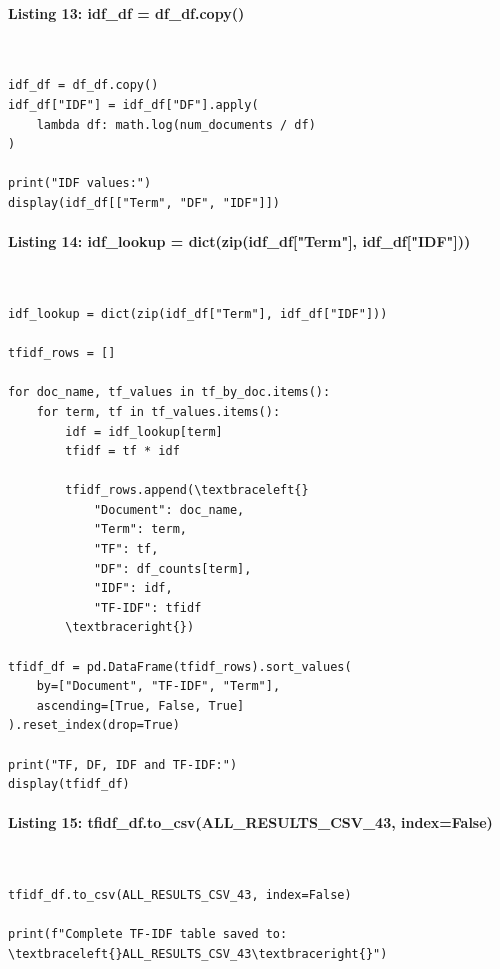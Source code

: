 \documentclass[12pt,a4paper,oneside]{report}
\begin{document}
\paragraph{Listing 13: idf\_df = df\_df.copy()}\mbox{}\\[-1ex]
\begin{Verbatim}[commandchars=\\\{\},breaklines=true,breakanywhere=true,fontsize=\scriptsize,frame=leftline,framesep=2mm,rulecolor=\color{gray}]
idf_df = df_df.copy()
idf_df["IDF"] = idf_df["DF"].apply(
    lambda df: math.log(num_documents / df)
)

print("IDF values:")
display(idf_df[["Term", "DF", "IDF"]])
\end{Verbatim}
\paragraph{Listing 14: idf\_lookup = dict(zip(idf\_df["Term"], idf\_df["IDF"]))}\mbox{}\\[-1ex]
\begin{Verbatim}[commandchars=\\\{\},breaklines=true,breakanywhere=true,fontsize=\scriptsize,frame=leftline,framesep=2mm,rulecolor=\color{gray}]
idf_lookup = dict(zip(idf_df["Term"], idf_df["IDF"]))

tfidf_rows = []

for doc_name, tf_values in tf_by_doc.items():
    for term, tf in tf_values.items():
        idf = idf_lookup[term]
        tfidf = tf * idf

        tfidf_rows.append(\textbraceleft{}
            "Document": doc_name,
            "Term": term,
            "TF": tf,
            "DF": df_counts[term],
            "IDF": idf,
            "TF-IDF": tfidf
        \textbraceright{})

tfidf_df = pd.DataFrame(tfidf_rows).sort_values(
    by=["Document", "TF-IDF", "Term"],
    ascending=[True, False, True]
).reset_index(drop=True)

print("TF, DF, IDF and TF-IDF:")
display(tfidf_df)
\end{Verbatim}
\paragraph{Listing 15: tfidf\_df.to\_csv(ALL\_RESULTS\_CSV\_43, index=False)}\mbox{}\\[-1ex]
\begin{Verbatim}[commandchars=\\\{\},breaklines=true,breakanywhere=true,fontsize=\scriptsize,frame=leftline,framesep=2mm,rulecolor=\color{gray}]
tfidf_df.to_csv(ALL_RESULTS_CSV_43, index=False)

print(f"Complete TF-IDF table saved to: \textbraceleft{}ALL_RESULTS_CSV_43\textbraceright{}")
\end{Verbatim}
\end{document}
